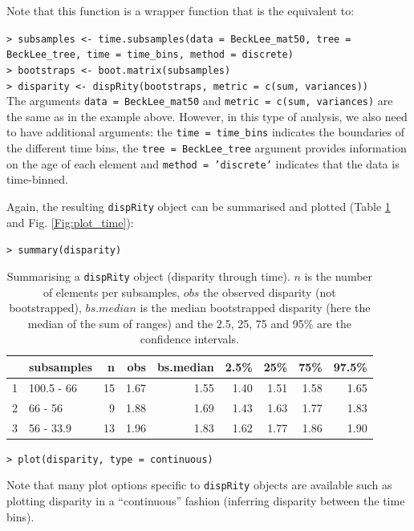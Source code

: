 \documentclass[12pt,letterpaper]{article}
\newcommand{\disp}{\texttt{dispRity} }
\begin{document}
\noindent Note that this function is a wrapper function that is the equivalent to:

\noindent \texttt{> subsamples <- time.subsamples(data = BeckLee\_mat50, tree = BeckLee\_tree, time = time\_bins, method = \textquotedbl discrete\textquotedbl)}\\
\noindent \texttt{> bootstraps <- boot.matrix(subsamples)}\\
\noindent \texttt{> disparity <- dispRity(bootstraps, metric = c(sum, variances))}\\

\noindent The arguments \texttt{data = BeckLee\_mat50} and \texttt{metric = c(sum, variances)} are the same as in the example above.
However, in this type of analysis, we also need to have additional arguments: the \texttt{time = time\_bins} indicates the boundaries of the different time bins, the \texttt{tree = BeckLee\_tree} argument provides information on the age of each element and \texttt{method = 'discrete'} indicates that the data is time-binned.

Again, the resulting \disp object can be summarised and plotted (Table \ref{Tab:summary_time} and Fig. \ref{Fig:plot_time}):

\noindent \texttt{> summary(disparity)}

\begin{table}[ht]
\centering
\begin{tabular}{rlrrrrrrr}
  \hline
 & subsamples & n & obs & bs.median & 2.5\% & 25\% & 75\% & 97.5\% \\ 
  \hline
1 & 100.5 - 66 &  15 & 1.67 & 1.55 & 1.40 & 1.51 & 1.58 & 1.65 \\ 
  2 & 66 - 56 &   9 & 1.88 & 1.69 & 1.43 & 1.63 & 1.77 & 1.83 \\ 
  3 & 56 - 33.9 &  13 & 1.96 & 1.83 & 1.62 & 1.77 & 1.86 & 1.90 \\ 
   \hline
\end{tabular}
\caption{Summarising a \disp object (disparity through time). $n$ is the number of elements per subsamples, $obs$ the observed disparity (not bootstrapped), $bs.median$ is the median bootstrapped disparity (here the median of the sum of ranges) and the 2.5, 25, 75 and 95\% are the confidence intervals.}
\label{Tab:summary_time}
\end{table}

\noindent \texttt{> plot(disparity, type = \textquotedbl continuous\textquotedbl)}

\noindent Note that many plot options specific to \disp objects are available such as plotting disparity in a ``continuous'' fashion (inferring disparity between the time bins).
\end{document}
